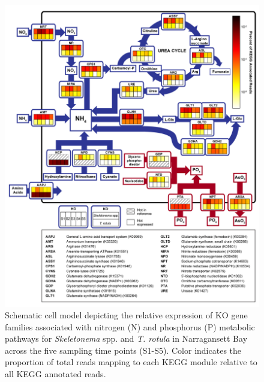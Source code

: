 
\begin{figure}[p!]
  \centering
    \includegraphics[width=1\textwidth]{Images/C3_Figure3_CellHeatmap_Hot.png}
    \caption[Modulation of nitrogen and phosphorus pathways in the field]{Schematic cell model depicting the relative expression of KO gene families associated with nitrogen (N) and phosphorus (P) metabolic pathways for \textit{Skeletonema} spp. and \textit{T. rotula} in Narragansett Bay across the five sampling time points (S1-S5). Color indicates the proportion of total reads mapping to each KEGG module relative to all KEGG annotated reads.}

  \label{fig:c3f3}
\end{figure}



